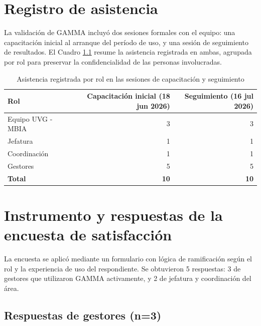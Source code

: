 \chapter{Registro de asistencia}

La validación de GAMMA incluyó dos sesiones formales con el equipo: una capacitación inicial al arranque del período de uso, y una sesión de seguimiento de resultados. El Cuadro \ref{tab:asistencia} resume la asistencia registrada en ambas, agrupada por rol para preservar la confidencialidad de las personas involucradas.

\begin{table}[!htb]
\centering
\caption{Asistencia registrada por rol en las sesiones de capacitación y seguimiento}
\label{tab:asistencia}
\begin{tabular}{lrr}
\toprule
\textbf{Rol} & \textbf{Capacitación inicial (18 jun 2026)} & \textbf{Seguimiento (16 jul 2026)} \\
\midrule
Equipo UVG - MBIA & 3 & 3 \\
Jefatura & 1 & 1 \\
Coordinación & 1 & 1 \\
Gestores & 5 & 5 \\
\midrule
\textbf{Total} & \textbf{10} & \textbf{10} \\
\bottomrule
\end{tabular}

\end{table}

\chapter{Instrumento y respuestas de la encuesta de satisfacción}

La encuesta se aplicó mediante un formulario con lógica de ramificación según el rol y la experiencia de uso del respondiente. Se obtuvieron 5 respuestas: 3 de gestores que utilizaron GAMMA activamente, y 2 de jefatura y coordinación del área.

\section*{Respuestas de gestores (n=3)}

